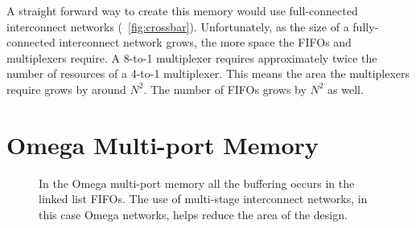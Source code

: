     A straight forward way to create this memory would use full-connected interconnect networks (\figurename~\ref{fig:crossbar}). Unfortunately, as the size of a fully-connected interconnect network grows, the more space the FIFOs and multiplexers require. A 8-to-1 multiplexer requires approximately twice the number of resources of a 4-to-1 multiplexer. This means the area the multiplexers require grows by around $N^2$. The number of FIFOs grows by $N^2$ as well.

\section{Omega Multi-port Memory}
    \begin{figure}
        \center
        \caption[Omega multi-port memory]{In the Omega multi-port memory all the buffering occurs in the linked list FIFOs. The use of multi-stage interconnect networks, in this case Omega networks, helps reduce the area of the design.}
        \label{fig:versionb}
    \end{figure}
